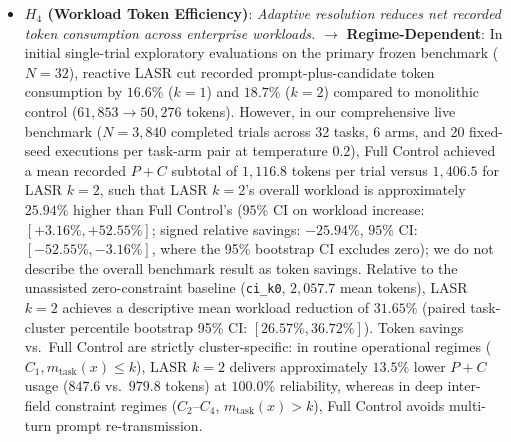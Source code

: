 \begin{itemize}
    \item \textbf{$H_4$ (Workload Token Efficiency)}: \textit{Adaptive resolution reduces net recorded token consumption across enterprise workloads.} $\rightarrow$ \textbf{Regime-Dependent}: In initial single-trial exploratory evaluations on the primary frozen benchmark ($N=32$), reactive LASR cut recorded prompt-plus-candidate token consumption by $16.6\%$ ($k=1$) and $18.7\%$ ($k=2$) compared to monolithic control ($61,853 \rightarrow 50,276$ tokens). However, in our comprehensive live benchmark ($N=3,840$ completed trials across 32 tasks, 6 arms, and 20 fixed-seed executions per task-arm pair at temperature $0.2$), Full Control achieved a mean recorded $P+C$ subtotal of $1,116.8$ tokens per trial versus $1,406.5$ for LASR $k=2$, such that LASR $k=2$'s overall workload is approximately $25.94\%$ higher than Full Control's ($95\%$ CI on workload increase: $[+3.16\%, +52.55\%]$; signed relative savings: $-25.94\%$, $95\%$ CI: $[-52.55\%, -3.16\%]$, where the 95\% bootstrap CI excludes zero); we do not describe the overall benchmark result as token savings. Relative to the unassisted zero-constraint baseline (\texttt{ci\_k0}, $2,057.7$ mean tokens), LASR $k=2$ achieves a descriptive mean workload reduction of $31.65\%$ (paired task-cluster percentile bootstrap 95\% CI: $[26.57\%, 36.72\%]$). Token savings vs.\ Full Control are strictly cluster-specific: in routine operational regimes ($C_1, m_{\text{task}}(x) \le k$), LASR $k=2$ delivers approximately $13.5\%$ lower $P+C$ usage ($847.6$ vs.\ $979.8$ tokens) at $100.0\%$ reliability, whereas in deep inter-field constraint regimes ($C_2\text{--}C_4$, $m_{\text{task}}(x) > k$), Full Control avoids multi-turn prompt re-transmission.
\end{itemize}

